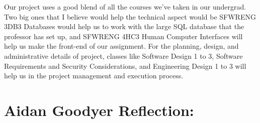 \begin{enumerate}
    \par{Our project uses a good blend of all the courses we’ve taken in our undergrad. Two big ones that I believe would help the technical aspect would be SFWRENG 3DB3 Databases would help us to work with the large SQL database that the professor has set up, and SFWRENG 4HC3 Human Computer Interfaces will help us make the front-end of our assignment. For the planning, design, and administrative details of project, classes like Software Design 1 to 3, Software Requirements and Security Considerations, and Engineering Design 1 to 3 will help us in the project management and execution process.}

\end{enumerate}

\section{Aidan Goodyer Reflection:}


